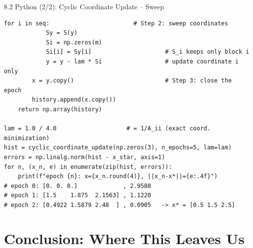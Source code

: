 \documentclass[aspectratio=169,10pt]{beamer}
\begin{document}
\begin{frame}[fragile]{8.2 Python (2/2): Cyclic Coordinate Update -- Sweep}
\begin{lstlisting}[caption={Algorithm 10, Steps 2--3, and results on $Ax=b$}]
        for i in seq:                        # Step 2: sweep coordinates
            Sy = S(y)
            Si = np.zeros(m)
            Si[i] = Sy[i]                     # S_i keeps only block i
            y = y - lam * Si                  # update coordinate i only
        x = y.copy()                          # Step 3: close the epoch
        history.append(x.copy())
    return np.array(history)

lam = 1.0 / 4.0                    # = 1/A_ii (exact coord. minimization)
hist = cyclic_coordinate_update(np.zeros(3), n_epochs=5, lam=lam)
errors = np.linalg.norm(hist - x_star, axis=1)
for n, (x_n, e) in enumerate(zip(hist, errors)):
    print(f"epoch {n}: x={x_n.round(4)}, ||x_n-x*||={e:.4f}")
# epoch 0: [0. 0. 0.]             , 2.9580
# epoch 1: [1.5    1.875  2.1563] , 1.1220
# epoch 2: [0.4922 1.5879 2.48  ] , 0.0905   -> x* = [0.5 1.5 2.5]
\end{lstlisting}
\end{frame}

\section{Conclusion: Where This Leaves Us}
\end{document}
